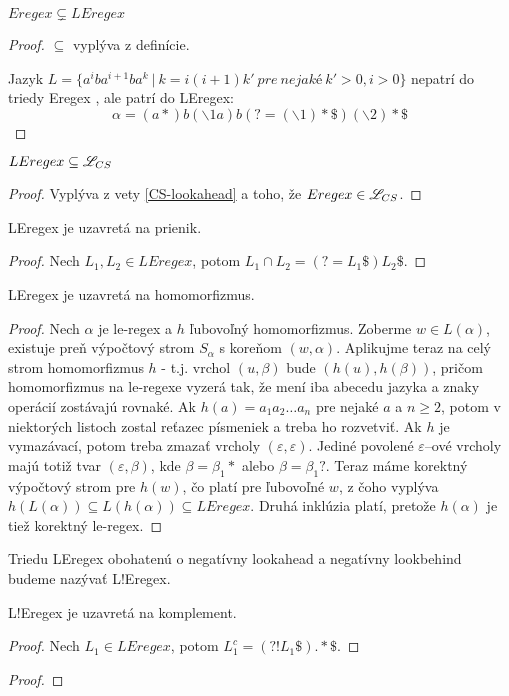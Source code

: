 \begin{veta}
$ Eregex \subsetneq LEregex $
\end{veta}
\begin{proof}
$ \subseteq $ vyplýva z definície.

Jazyk $L = \lbrace a^iba^{i+1}ba^k ~|~ k=i(i+1)k' ~ pre ~ nejaké ~ k'>0, i>0 \rbrace$ nepatrí do triedy Eregex \cite[Lemma 2]{ExtendedRegexIntersec}, ale patrí do LEregex:
$$ \alpha = (a*)b(\backslash 1a)b(?=(\backslash 1)* \mathdollar )(\backslash 2)* \mathdollar $$
\end{proof}

\begin{veta}
$ LEregex \subseteq \mathscr{L}_{CS} $
\end{veta}
\begin{proof}
Vyplýva z vety \ref{CS-lookahead} a toho, že $ Eregex \in \mathscr{L}_{CS} $.
\end{proof}

\begin{veta}
LEregex je uzavretá na prienik.
\end{veta}
\begin{proof}
Nech $L_1,L_2 \in LEregex$, potom $L_1 \cap L_2 = \left( ?= L_1 \mathdollar \right) L_2 \mathdollar $.
\end{proof}

\begin{veta}
LEregex je uzavretá na homomorfizmus.
\end{veta}
\begin{proof}
Nech $\alpha$ je le-regex a $h$ ľubovoľný homomorfizmus. Zoberme $w \in L(\alpha)$, existuje preň výpočtový strom $S_\alpha$ s koreňom $(w,\alpha)$. Aplikujme teraz na celý strom homomorfizmus $h$ - t.j. vrchol $(u,\beta)$ bude $(h(u),h(\beta))$, pričom homomorfizmus na le-regexe vyzerá tak, že mení iba abecedu jazyka a znaky operácií zostávajú rovnaké. Ak $h(a) = a_1a_2\dots a_n$ pre nejaké $a$ a $n \geq 2$, potom v niektorých listoch zostal reťazec písmeniek a treba ho rozvetviť. Ak $h$ je vymazávací, potom treba zmazať vrcholy $(\varepsilon,\varepsilon)$. Jediné povolené $\varepsilon$--ové vrcholy majú totiž tvar $(\varepsilon,\beta)$, kde $\beta = \beta_1 *$ alebo $\beta = \beta_1 ?$. Teraz máme korektný výpočtový strom pre $h(w)$, čo platí pre ľubovoľné $w$, z čoho vyplýva $h(L(\alpha)) \subseteq L(h(\alpha)) \subseteq LEregex$. Druhá inklúzia platí, pretože $h(\alpha)$ je tiež korektný le-regex.
\end{proof}


Triedu LEregex obohatenú o negatívny lookahead a negatívny lookbehind budeme nazývať L!Eregex.

\begin{veta}
L!Eregex je uzavretá na komplement.
\end{veta}
\begin{proof}
Nech $L_1 \in LEregex$, potom $L_1^c  = \left( ?! L_1 \mathdollar \right) .* \mathdollar $.
\end{proof}

\begin{veta}
\end{veta}
\begin{proof}
\end{proof}


